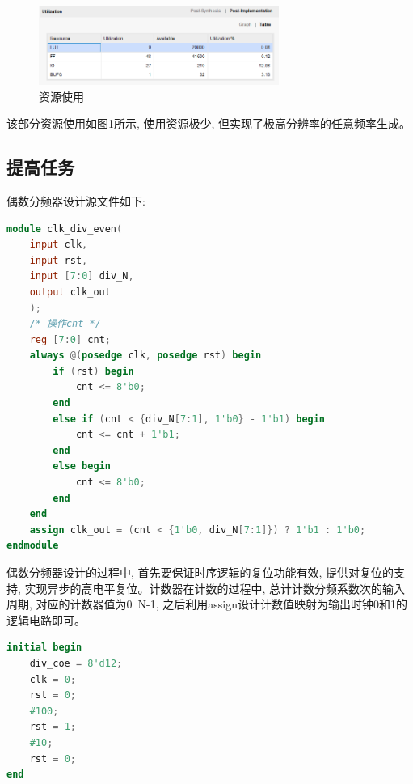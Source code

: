 \documentclass{article}
\begin{document}
\begin{figure}[H]
    \centering
    \includegraphics[width=0.7\textwidth]{image/2024-06-17-17-00-36.png}
    \caption{资源使用}
    \label{image_30Hz_utilization}
\end{figure}
该部分资源使用如图\ref{image_30Hz_utilization}所示, 使用资源极少, 但实现了极高分辨率的任意频率生成。
\subsection*{提高任务}
偶数分频器设计源文件如下:
\begin{lstlisting}[language=Verilog, caption={通用偶数分频器源文件}]
module clk_div_even(
    input clk,
    input rst,
    input [7:0] div_N,
    output clk_out
    );
    /* 操作cnt */
    reg [7:0] cnt;
    always @(posedge clk, posedge rst) begin
        if (rst) begin
            cnt <= 8'b0;
        end
        else if (cnt < {div_N[7:1], 1'b0} - 1'b1) begin
            cnt <= cnt + 1'b1;
        end
        else begin
            cnt <= 8'b0;
        end
    end
    assign clk_out = (cnt < {1'b0, div_N[7:1]}) ? 1'b1 : 1'b0;
endmodule    
\end{lstlisting}
偶数分频器设计的过程中, 首先要保证时序逻辑的复位功能有效, 提供对复位的支持, 实现异步的高电平复位。计数器在计数的过程中, 总计计数分频系数次的输入周期,
对应的计数器值为0~N-1, 之后利用assign设计计数值映射为输出时钟0和1的逻辑电路即可。
\begin{lstlisting}[language=Verilog, caption={偶数分频器仿真激励}]
initial begin
    div_coe = 8'd12;
    clk = 0;
    rst = 0;
    #100;
    rst = 1;
    #10;
    rst = 0;
end
\end{lstlisting}
\end{document}
